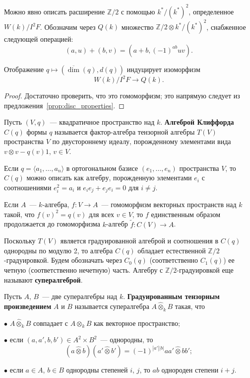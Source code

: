 \documentclass[a4paper,oneside,12pt]{article}
\theoremstyle{plain} { \swapnumbers
\newtheorem{theorem}{Теорема}[subsection]
\newtheorem{corollary}[theorem]{Следствие}
\newtheorem{lemma}[theorem]{Лемма}
\newtheorem{proposition}[theorem]{Утверждение}
\newtheorem{claim}[theorem]{Факт}
}
\theoremstyle{definition} { \swapnumbers
\newtheorem{definition}[theorem]{Определение}
\newtheorem{notation}[theorem]{Обозначение}
\newtheorem{remark}[theorem]{Замечание}
\newtheorem{remarks}[theorem]{Замечания}
\newtheorem{example}[theorem]{Пример}
\newtheorem{examples}[theorem]{Примеры}
\newtheorem{sssection}[theorem]{}
}
\def\tilde{\widetilde}
\def\la{\langle}
\def\ra{\rangle}
\begin{document}
Можно явно описать расширение $\mathbb Z/2$ с помощью $k^*/(k^*)^2$, определенное $W(k)/I^2F$.
Обозначим через $Q(k)$ множество $\mathbb Z/2\otimes k^*/(k^*)^2$, снабженное следующей операцией:
$$
(a,u)+(b,v)=(a+b,(-1)^{ab}uv).
$$

\begin{proposition}\label{prop:group_Q}
Отображение $q\mapsto (\overline{\dim}(q),d(q))$ индуцирует изоморфизм
$$
W(k)/I^2F\to Q(k).
$$
\end{proposition}
\begin{proof}
Достаточно проверить, что это гомоморфизм; это напрямую следует из
предложения~\ref{prop:disc_properties}.
\end{proof}

\begin{definition}
Пусть $(V,q)$~--- квадратичное пространство над $k$. {\bf Алгеброй Клиффорда} $C(q)$
формы $q$ называется фактор-алгебра тензорной алгебры $T(V)$ пространства $V$ по
двустороннему идеалу, порожденному элементами вида $v\otimes v-q(v)1$, $v\in V$.
\end{definition}

Если $q=\la a_1,\dots,a_n\ra$ в ортогональном базисе $(e_1,\dots,e_n)$ пространства $V$,
то $C(q)$ можно описать как алгебру, порожденную элементами $e_i$ с соотношениями
$e_i^2=a_i$ и $e_ie_j+e_je_i=0$ для $i\neq j$.

\begin{proposition}
Если $A$~--- $k$-алгебра, $f\colon V\to A$~--- гомоморфизм векторных пространств
над $k$ такой, что $f(v)^2=q(v)$ для всех $v\in V$, то $f$ единственным образом
продолжается до гомоморфизма $k$-алгебр $\tilde f\colon C(V)\to A$.
\end{proposition}

Поскольку $T(V)$ является градуированной алгеброй и соотношения в $C(q)$ однородны
по модулю 2, то алгебра $C(q)$ обладает естественной $\mathbb Z/2$-градуировкой.
Будем обозначать через $C_0(q)$ (соответственно $C_1(q)$) ее четную (соответственно нечетную) часть.
Алгебру с $\mathbb Z/2$-градуировкой еще называют {\bf супералгеброй}.

\begin{definition}
Пусть $A$, $B$~--- две супералгебры над $k$. {\bf Градуированным тензорным произведением} $A$ и $B$
называется супералгебра $A\hat\otimes_k B$ такая, что
\par\noindent $\bullet$ $A\hat\otimes_k B$ совпадает с $A\otimes_k B$ как векторное пространство;
\par\noindent $\bullet$ если $(a,a',b,b')\in A^2\times B^2$~--- однородны, то
$$
(a\hat\otimes b)(a'\hat\otimes b')=(-1)^{|a'||b|}aa'\hat\otimes bb';
$$
\par\noindent $\bullet$ если $a\in A$, $b\in B$ однородны степеней $i$, $j$, то $ab$ однороден
степени $i+j$.
\end{definition}
\end{document}
